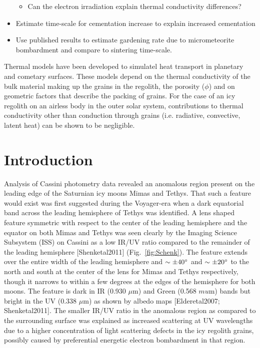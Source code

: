 \documentclass[11pt]{article} %
\begin{document}
\begin{itemize}
\begin{itemize}
		\item Can the electron irradiation explain thermal conductivity differences?
		\end{itemize}
	\item Estimate time-scale for cementation increase to explain increased cementation
	\item Use published results to estimate gardening rate due to micrometeorite bombardment and compare to sintering time-scale.
	\end{itemize}

	Thermal models have been developed to simulatel heat transport in planetary and cometary surfaces. These models depend on the thermal conductivity of the bulk material making up the grains in the regolith, the porosity ($\phi$) and on geometric factors that describe the packing of grains. For the case of an icy regolith on an airless body in the outer solar system, contributions to thermal conductivity other than conduction through grains (i.e. radiative, convective, latent heat) can be shown to be negligible.

\newpage
\section{Introduction}
\label{sec:intro}

	Analysis of Cassini photometry data revealed an anomalous region present on the leading edge of the Saturnian icy moons Mimas and Tethys. That such a feature would exist was first suggested during the Voyager-era when a dark equatorial band across the leading hemisphere of Tethys was identified. A lens shaped feature symmetric with respect to the center of the leading hemisphere and the equator on both Mimas and Tethys was seen clearly by the Imaging Science Subsystem (ISS) on Cassini as a low IR/UV ratio compared to the remainder of the leading hemisphere [Shenketal2011] (Fig.~\ref{fig:Schenk}). The feature extends over the entire width of the leading hemisphere and $\sim\pm40\degree$ and $\sim\pm20\degree$ to the north and south at the center of the lens for Mimas and Tethys respectively, though it narrows to within a few degrees at the edges of the hemisphere for both moons. The feature is dark in IR (0.930 $\mu$m) and Green (0.568 $mu$m) bands but bright in the UV (0.338 $\mu$m) as shown by albedo maps [Elderetal2007; Shenketal2011]. The smaller IR/UV ratio in the anomalous region as compared to the surrounding surface was explained as increased scattering at UV wavelengths due to a higher concentration of light scattering defects in the icy regolith grains, possibly caused by preferential energetic electron bombardment in that region.
	
\end{document}

